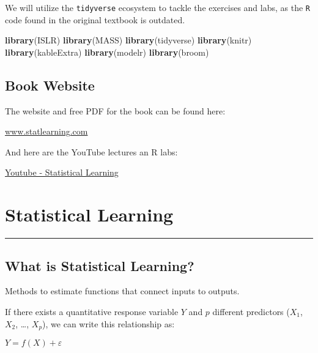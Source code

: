 \documentclass[]{book}
\newenvironment{Shaded}{\begin{snugshade}}{\end{snugshade}}
\newcommand{\KeywordTok}[1]{\textcolor[rgb]{0.13,0.29,0.53}{\textbf{#1}}}
\newcommand{\NormalTok}[1]{#1}
\begin{document}
We will utilize the \texttt{tidyverse} ecosystem to tackle the exercises and labs, as the \texttt{R} code found in the original textbook is outdated.

\begin{Shaded}
\begin{Highlighting}[]
\KeywordTok{library}\NormalTok{(ISLR)}
\KeywordTok{library}\NormalTok{(MASS)}
\KeywordTok{library}\NormalTok{(tidyverse)}
\KeywordTok{library}\NormalTok{(knitr)}
\KeywordTok{library}\NormalTok{(kableExtra)}
\KeywordTok{library}\NormalTok{(modelr)}
\KeywordTok{library}\NormalTok{(broom)}
\end{Highlighting}
\end{Shaded}

\hypertarget{book-website}{%
\section{Book Website}\label{book-website}}

The website and free PDF for the book can be found here:

\href{http://www-bcf.usc.edu/~gareth/ISL/}{www.statlearning.com}

And here are the YouTube lectures an R labs:

\href{https://www.youtube.com/channel/UC4OWDcPB1peiBXDfCSZ3h-w}{Youtube - Statistical Learning}

\hypertarget{statistical-learning}{%
\chapter{Statistical Learning}\label{statistical-learning}}

\begin{center}\rule{0.5\linewidth}{\linethickness}\end{center}

\hypertarget{what-is-statistical-learning}{%
\section{What is Statistical Learning?}\label{what-is-statistical-learning}}

Methods to estimate functions that connect inputs to outputs.

If there exists a quantitative response variable \(Y\) and \(p\) different predictors (\(X_1\), \(X_2\), \ldots{}, \(X_p\)), we can write this relationship as:

\(Y = f(X) + ε\)
\end{document}
